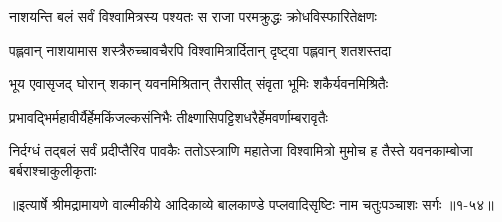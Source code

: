 \twolineshloka
{नाशयन्ति बलं सर्वं विश्वामित्रस्य पश्यतः}
{स राजा परमक्रुद्धः क्रोधविस्फारितेक्षणः} %

\twolineshloka
{पह्लवान् नाशयामास शस्त्रैरुच्चावचैरपि}
{विश्वामित्रार्दितान् दृष्ट्वा पह्लवान् शतशस्तदा} %

\twolineshloka
{भूय एवासृजद् घोरान् शकान् यवनमिश्रितान्}
{तैरासीत् संवृता भूमिः शकैर्यवनमिश्रितैः} %

\twolineshloka
{प्रभावद्भिर्महावीर्यैर्हेमकिंजल्कसंनिभैः}
{तीक्ष्णासिपट्टिशधरैर्हेमवर्णाम्बरावृतैः} %

\threelineshloka
{निर्दग्धं तद्बलं सर्वं प्रदीप्तैरिव पावकैः}
{ततोऽस्त्राणि महातेजा विश्वामित्रो मुमोच ह}
{तैस्ते यवनकाम्बोजा बर्बराश्चाकुलीकृताः} %


॥इत्यार्षे श्रीमद्रामायणे वाल्मीकीये आदिकाव्ये बालकाण्डे पप्लवादिसृष्टिः नाम चतुःपञ्चाशः सर्गः ॥१-५४॥
